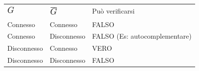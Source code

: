 \documentclass{article}
\begin{document}
\protect\hypertarget{t.b6067c6d36f86489b9093689693d69077c2015d4}{}{}\protect\hypertarget{t.39}{}{}

\begin{longtable}[]{@{}lll@{}}
\toprule
\begin{minipage}[t]{0.30\columnwidth}\raggedright\strut
\includegraphics{images/image340.png}\strut
\end{minipage} & \begin{minipage}[t]{0.30\columnwidth}\raggedright\strut
\includegraphics{images/image438.png}\strut
\end{minipage} & \begin{minipage}[t]{0.30\columnwidth}\raggedright\strut
{Può verificarsi}\strut
\end{minipage}\tabularnewline
\begin{minipage}[t]{0.30\columnwidth}\raggedright\strut
{Connesso}\strut
\end{minipage} & \begin{minipage}[t]{0.30\columnwidth}\raggedright\strut
{Connesso}\strut
\end{minipage} & \begin{minipage}[t]{0.30\columnwidth}\raggedright\strut
{FALSO}\strut
\end{minipage}\tabularnewline
\begin{minipage}[t]{0.30\columnwidth}\raggedright\strut
{Connesso}\strut
\end{minipage} & \begin{minipage}[t]{0.30\columnwidth}\raggedright\strut
{Disconnesso}\strut
\end{minipage} & \begin{minipage}[t]{0.30\columnwidth}\raggedright\strut
{FALSO (Es: autocomplementare)}\strut
\end{minipage}\tabularnewline
\begin{minipage}[t]{0.30\columnwidth}\raggedright\strut
{Disconnesso}\strut
\end{minipage} & \begin{minipage}[t]{0.30\columnwidth}\raggedright\strut
{Connesso}\strut
\end{minipage} & \begin{minipage}[t]{0.30\columnwidth}\raggedright\strut
{VERO}\strut
\end{minipage}\tabularnewline
\begin{minipage}[t]{0.30\columnwidth}\raggedright\strut
{Disconnesso}\strut
\end{minipage} & \begin{minipage}[t]{0.30\columnwidth}\raggedright\strut
{Disconnesso}\strut
\end{minipage} & \begin{minipage}[t]{0.30\columnwidth}\raggedright\strut
{FALSO}\strut
\end{minipage}\tabularnewline
\bottomrule
\end{longtable}
\end{document}
